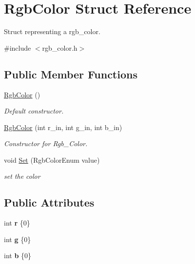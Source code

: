 \hypertarget{structRgbColor}{}\section{Rgb\+Color Struct Reference}
\label{structRgbColor}


Struct representing a rgb\+\_\+color.  




{\ttfamily \#include $<$rgb\+\_\+color.\+h$>$}

\subsection*{Public Member Functions}
\begin{DoxyCompactItemize}
\item 
\hyperlink{structRgbColor_a264da0270aca412d62197e046b71b08e}{Rgb\+Color} ()
\begin{DoxyCompactList}\small\item\em Default constructor. \end{DoxyCompactList}\item 
\hyperlink{structRgbColor_a61e213533bfff019aebd27f991688222}{Rgb\+Color} (int r\+\_\+in, int g\+\_\+in, int b\+\_\+in)
\begin{DoxyCompactList}\small\item\em Constructor for Rgb\+\_\+\+Color. \end{DoxyCompactList}\item 
void \hyperlink{structRgbColor_a57fcd9161e0ee6a38e707c5002db55b8}{Set} (Rgb\+Color\+Enum value)
\begin{DoxyCompactList}\small\item\em set the color \end{DoxyCompactList}\end{DoxyCompactItemize}
\subsection*{Public Attributes}
\begin{DoxyCompactItemize}
\item 
int {\bfseries r} \{0\}\hypertarget{structRgbColor_aa6c2fac108029c79f7cc96fb6d34717f}{}\label{structRgbColor_aa6c2fac108029c79f7cc96fb6d34717f}

\item 
int {\bfseries g} \{0\}\hypertarget{structRgbColor_afbc54745bd4ed7ede168e31922143eff}{}\label{structRgbColor_afbc54745bd4ed7ede168e31922143eff}

\item 
int {\bfseries b} \{0\}\hypertarget{structRgbColor_af1ba4837230cfc3b0f31454ccdb03df6}{}\label{structRgbColor_af1ba4837230cfc3b0f31454ccdb03df6}

\end{DoxyCompactItemize}


